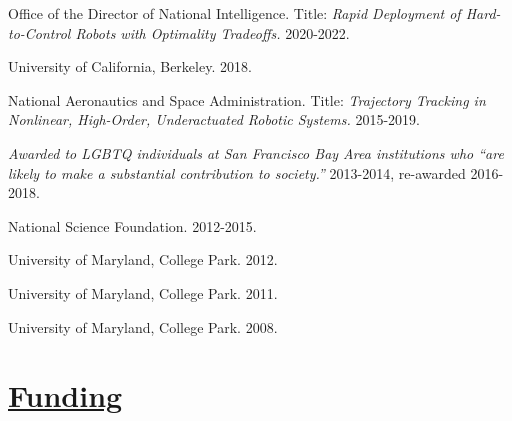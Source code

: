 \documentclass[letterpaper]{deedy-resume} %
\begin{document}
\begin{etaremune}[itemsep=0.05cm]


\item {{} Office of the Director of National Intelligence. Title: {\it Rapid Deployment of Hard-to-Control Robots with Optimality Tradeoffs.} 2020-2022.}

\item {{} University of California, Berkeley. 2018.}

\item {{} National Aeronautics and Space Administration. Title: {\it Trajectory Tracking in Nonlinear, High-Order, Underactuated Robotic Systems.} 2015-2019.}
  
\item {{} {\it Awarded to LGBTQ individuals at San Francisco Bay Area institutions who ``are likely to make a substantial contribution to society.''} 2013-2014, re-awarded 2016-2018.}

\item {{} National Science Foundation. 2012-2015.}

\item {{} University of Maryland, College Park. 2012.}

\item {{} University of Maryland, College Park. 2011.}

\item {{} University of Maryland, College Park. 2008.}

\end{etaremune}


\vspace{0.2cm}
\section{\underline{Funding}}
\end{document}

